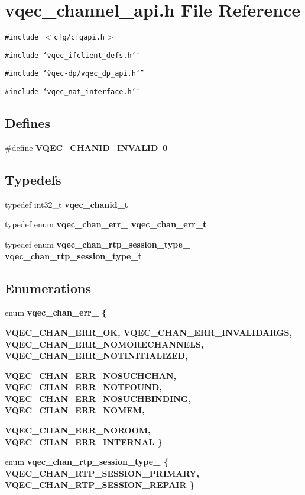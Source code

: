 \section{vqec\_\-channel\_\-api.h File Reference}
\label{vqec__channel__api_8h}
{\tt \#include $<$cfg/cfgapi.h$>$}\par
{\tt \#include \char`\"{}vqec\_\-ifclient\_\-defs.h\char`\"{}}\par
{\tt \#include \char`\"{}vqec-dp/vqec\_\-dp\_\-api.h\char`\"{}}\par
{\tt \#include \char`\"{}vqec\_\-nat\_\-interface.h\char`\"{}}\par
\subsection*{Defines}
\begin{CompactItemize}
\item 
\#define \bf{VQEC\_\-CHANID\_\-INVALID}~0
\end{CompactItemize}
\subsection*{Typedefs}
\begin{CompactItemize}
\item 
typedef int32\_\-t \bf{vqec\_\-chanid\_\-t}
\item 
typedef enum \bf{vqec\_\-chan\_\-err\_\-} \bf{vqec\_\-chan\_\-err\_\-t}
\item 
typedef enum \bf{vqec\_\-chan\_\-rtp\_\-session\_\-type\_\-} \bf{vqec\_\-chan\_\-rtp\_\-session\_\-type\_\-t}
\end{CompactItemize}
\subsection*{Enumerations}
\begin{CompactItemize}
\item 
enum \bf{vqec\_\-chan\_\-err\_\-} \{ \par
\bf{VQEC\_\-CHAN\_\-ERR\_\-OK}, 
\bf{VQEC\_\-CHAN\_\-ERR\_\-INVALIDARGS}, 
\bf{VQEC\_\-CHAN\_\-ERR\_\-NOMORECHANNELS}, 
\bf{VQEC\_\-CHAN\_\-ERR\_\-NOTINITIALIZED}, 
\par
\bf{VQEC\_\-CHAN\_\-ERR\_\-NOSUCHCHAN}, 
\bf{VQEC\_\-CHAN\_\-ERR\_\-NOTFOUND}, 
\bf{VQEC\_\-CHAN\_\-ERR\_\-NOSUCHBINDING}, 
\bf{VQEC\_\-CHAN\_\-ERR\_\-NOMEM}, 
\par
\bf{VQEC\_\-CHAN\_\-ERR\_\-NOROOM}, 
\bf{VQEC\_\-CHAN\_\-ERR\_\-INTERNAL}
 \}
\item 
enum \bf{vqec\_\-chan\_\-rtp\_\-session\_\-type\_\-} \{ \bf{VQEC\_\-CHAN\_\-RTP\_\-SESSION\_\-PRIMARY}, 
\bf{VQEC\_\-CHAN\_\-RTP\_\-SESSION\_\-REPAIR}
 \}
\end{CompactItemize}
